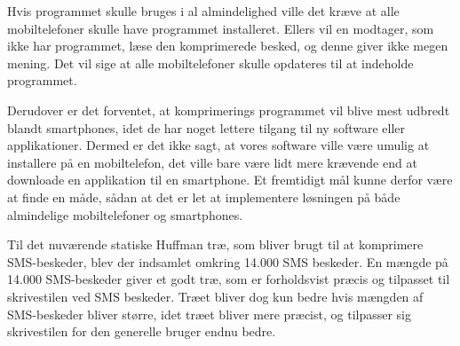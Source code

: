 Hvis programmet skulle bruges i al almindelighed ville det kræve at alle mobiltelefoner skulle have programmet installeret. Ellers vil en modtager, som ikke har programmet, læse den komprimerede besked, og denne giver ikke megen mening. Det vil sige at alle mobiltelefoner skulle opdateres til at indeholde programmet. 
 
Derudover er det forventet, at komprimerings programmet vil  blive mest udbredt blandt smartphones, idet de har noget lettere tilgang til ny software eller applikationer. Dermed er det ikke sagt, at vores software ville være umulig at installere på en mobiltelefon, det ville bare være lidt mere krævende end at downloade en applikation til en smartphone. Et fremtidigt mål kunne derfor være at finde en måde, sådan at det er let at implementere løsningen på både almindelige mobiltelefoner og smartphones. 

Til det nuværende statiske Huffman træ, som bliver brugt til at komprimere SMS-beskeder, blev der indsamlet omkring 14.000 SMS beskeder. En mængde på 14.000 SMS-beskeder giver et godt træ, som er forholdsvist præcis og tilpasset til skrivestilen ved SMS beskeder. Træet bliver dog kun bedre hvis mængden af SMS-beskeder bliver større, idet træet bliver mere præcist, og tilpasser sig skrivestilen for den generelle bruger endnu bedre.
 